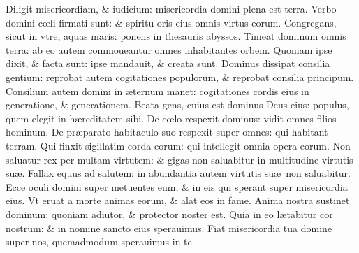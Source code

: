 \documentclass[a5paper,10pt]{book}
\def\ae{æ}
\def\oe{œ}
\begin{document}
\begin{multicols*}{2}
\newline \color{red} D\color{black}iligit misericordiam, \& iudicium: misericordia domini plena est terra.
\newline \color{red} V\color{black}erbo domini c\oe li firmati sunt: \& spiritu oris eius omnis virtus eorum.
\newline \color{red} C\color{black}ongregans, sicut in vtre, aquas maris: ponens in thesauris abyssos.
\newline \color{red} T\color{black}imeat dominum omnis terra: ab eo autem commoueantur omnes inhabitantes orbem.
\newline \color{red} Q\color{black}uoniam ipse dixit, \& facta sunt: ipse mandauit, \& creata sunt.
\newline \color{red} D\color{black}ominus dissipat consilia gentium: reprobat autem cogitationes populorum, \& reprobat consilia principum.
\newline \color{red} C\color{black}onsilium autem domini in \ae ternum manet: cogitationes cordis eius in generatione, \& generationem.
\newline \color{red} B\color{black}eata gens, cuius est dominus Deus eius: populus, quem elegit in h\ae reditatem sibi.
\newline \color{red} D\color{black}e c\oe lo respexit dominus: vidit omnes filios hominum.
\newline \color{red} D\color{black}e pr\ae parato habitaculo suo respexit super omnes: qui habitant terram.
\newline \color{red} Q\color{black}ui finxit sigillatim corda eorum: qui intellegit omnia opera eorum.
\newline \color{red} N\color{black}on saluatur rex per multam virtutem: \& gigas non saluabitur in multitudine virtutis su\ae .
\newline \color{red} F\color{black}allax equus ad salutem: in abundantia autem virtutis su\ae \ non saluabitur.
\newline \color{red} E\color{black}cce oculi domini super metuentes eum, \& in eis qui sperant super misericordia eius.
\newline \color{red} V\color{black}t eruat a morte animas eorum, \& alat eos in fame.
\newline \color{red} A\color{black}nima nostra sustinet dominum: quoniam adiutor, \& protector noster est.
\newline \color{red} Q\color{black}uia in eo l\ae tabitur cor nostrum: \& in nomine sancto eius sperauimus.
\newline \color{red} F\color{black}iat misericordia tua domine super nos, quemadmodum sperauimus in te.

\end{multicols*}
\end{document}
